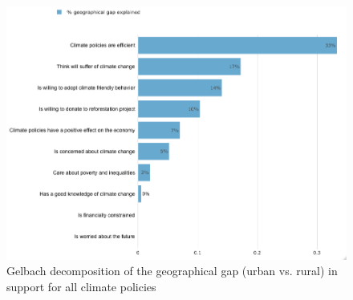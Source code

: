 \documentclass{article}
\begin{document}
\begin{figure}[h!]
	\caption{Gelbach decomposition of the geographical gap (urban vs. rural) in support for all climate policies}	
		\includegraphics[width=\textwidth]{gelbach_urban_all_policies_D2SD}
\end{figure}
\end{document}
